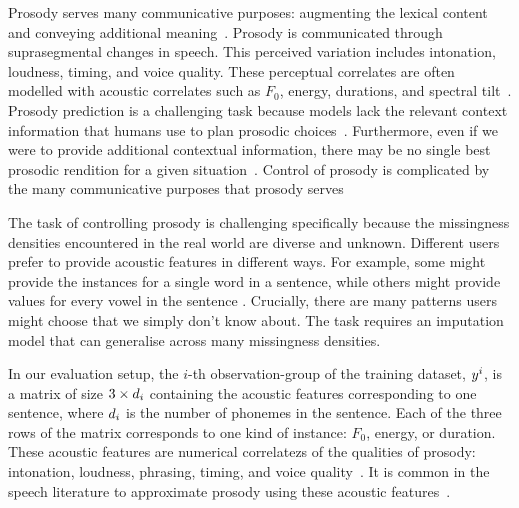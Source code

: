 \documentclass[../thesis.tex]{subfiles}
\begin{document}
 Prosody serves many communicative purposes: augmenting the lexical content~\citep{calhounCentralityMetricalStructure2010,tranNeuralModelsIntegrating2020,clarkGroundingCommunication1991} and conveying additional meaning~\citep{gravanoTurnyieldingCuesTaskoriented2009,bryantVerbalIronyWild2011,gironzettiProsodicMultimodalMarkers2017,ben-davidProsodySemanticsAre2016}. Prosody is communicated through suprasegmental changes in speech. This perceived variation includes intonation, loudness, timing, and voice quality. These perceptual correlates are often modelled with acoustic correlates such as $F_0$, energy, durations, and spectral tilt~\citep{wanCHiVEVaryingProsody2019,clarkGroundingCommunication1991,mohanCtrlPTemporalControl2021}.  Prosody prediction is a challenging task because models lack the relevant context information that humans use to plan prosodic choices~\citep{alRethinkingContextLanguage1992}. Furthermore, even if we were to provide additional contextual information, there may be no single best prosodic rendition for a given situation~\citep{hodariUsingGenerativeModelling2019}. Control of prosody is complicated by the many communicative purposes that prosody serves~\citep{clarkGroundingCommunication1991}

The task of controlling prosody is challenging specifically because the missingness densities encountered in the real world are diverse and unknown. Different users prefer to provide acoustic features in different ways. For example, some might provide the instances for a single word in a sentence, while others might provide values for every vowel in the sentence \citep{wagnerExperimentalTheoreticalAdvances2010}. Crucially, there are many patterns users might choose that we simply don't know about. The task requires an imputation model that can generalise across many missingness densities.

In our evaluation setup, the $i$-th observation-group of the training dataset, $y^i$, is a matrix of size $3 \times d_i$ containing the acoustic features corresponding to one sentence, where $d_i$ is the number of phonemes in the sentence. Each of the three rows of the matrix corresponds to one kind of instance: $F_0$, energy, or duration. These acoustic features are numerical correlatezs of the qualities of prosody: intonation, loudness, phrasing, timing, and voice quality~\citep{wagnerExperimentalTheoreticalAdvances2010}. It is common in the speech literature to approximate prosody using these acoustic features~\citep{mohanCtrlPTemporalControl2021}.
\end{document}
